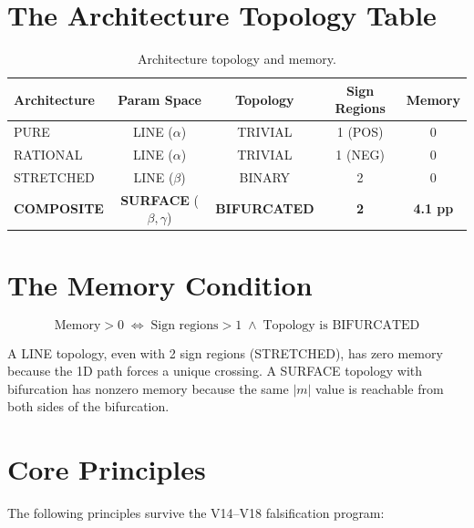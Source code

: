 \documentclass[11pt,a4paper,oneside]{report}
\begin{document}
\section{The Architecture Topology Table}

\begin{table}[h]
\centering
\caption{Architecture topology and memory.}
\label{tab:arch}
\begin{tabular}{lcccc}
\toprule
\textbf{Architecture} & \textbf{Param Space} & \textbf{Topology} & \textbf{Sign Regions} & \textbf{Memory}\\
\midrule
PURE      & LINE ($\alpha$)  & TRIVIAL    & 1 (POS) & 0\\
RATIONAL  & LINE ($\alpha$)  & TRIVIAL    & 1 (NEG) & 0\\
STRETCHED & LINE ($\beta$)   & BINARY     & 2       & 0\\
\textbf{COMPOSITE} & \textbf{SURFACE} ($\beta,\gamma$) & \textbf{BIFURCATED} & \textbf{2} & \textbf{4.1 pp}\\
\bottomrule
\end{tabular}
\end{table}

\section{The Memory Condition}

\begin{equation}
  \boxed{\text{Memory} > 0 \;\Longleftrightarrow\;
    \text{Sign regions} > 1 \;\land\;
    \text{Topology is BIFURCATED}}
  \label{eq:memcond}
\end{equation}

A LINE topology, even with 2 sign regions (STRETCHED), has zero memory
because the 1D path forces a unique crossing. A SURFACE topology with
bifurcation has nonzero memory because the same $|m|$ value is reachable
from both sides of the bifurcation.

\section{Core Principles}

The following principles survive the V14--V18 falsification program:
\end{document}
